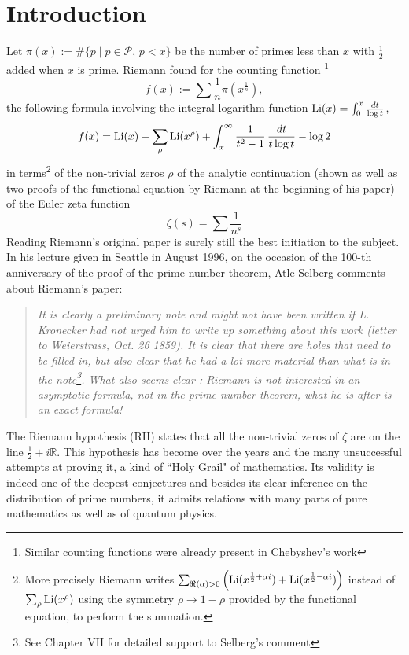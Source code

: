 \documentclass[12pt]{article}
\def\R{{\mathbb R}}
\def\cP{{\mathcal P}}
\def\li{{\rm Li}}
\begin{document}
\section{Introduction}
\label{intro}
Let $\pi(x):=\#\{p\mid p\in \cP, \, p<x\}$ be the number of primes less than $x$ with $\frac12$
added when $x$ is prime.
Riemann \cite{Riemann} found  for the counting function \footnote{Similar counting functions were already present in Chebyshev's work}
$$
f(x):=\sum \frac 1n \pi(x^{\frac 1n}), 
$$
the following formula
 involving the integral logarithm function $\li(x)=\int_0^x\frac{dt}{\log t}$,
\begin{equation}\label{Riemann1}
f(x)=\li(x)-\sum_\rho \li(x^{\rho})+\int_x^\infty \frac{1}{t^2-1}\,\frac{dt}{t\log t}-\log 2
\end{equation}
in terms\footnote{More precisely Riemann  writes $\sum_{\Re(\alpha)>0}\left(\li(x^{\frac 12+\alpha i})+\li(x^{\frac 12-\alpha i})\right)$ instead of $\sum_\rho \li(x^{\rho})$ using the symmetry $\rho\to 1-\rho$
provided by the functional equation, to perform the summation.} of the non-trivial zeros  $\rho$ of the analytic continuation (shown as well as two proofs of the functional equation by Riemann at the beginning of his paper) of the Euler zeta function
$$
\zeta(s)=\sum\frac{1}{n^s}
$$
Reading Riemann's original paper is surely still the best initiation to the subject.    In  his lecture given in Seattle  in August 1996, on the occasion of the 100-th anniversary of the proof of the prime number theorem, Atle Selberg comments about Riemann's paper:           \cite{Selbergseattle}
\begin{quote} {\em It is clearly a preliminary note and might not have been written if L. Kronecker had not urged him to write up something about this work (letter to Weierstrass, Oct. 26 1859). It is clear that there are holes that need to be filled in, but also clear that he had a lot more material than what is in the note\footnote{See \cite{RZeta} Chapter VII for detailed support to Selberg's comment}. What also seems clear : Riemann is not interested in an asymptotic formula, not in the prime number theorem, what he is after is an exact formula!}
\end{quote}


The Riemann hypothesis (RH) states that all the non-trivial zeros of $\zeta$ are on the line $\frac 12+i\R$. This hypothesis has become over the years and the many unsuccessful attempts at proving it, a kind of ``Holy Grail" of mathematics. Its validity is indeed one of the deepest conjectures and besides its clear inference on the distribution of prime numbers, it admits relations with many parts of pure mathematics as well as of quantum physics.
\end{document}
